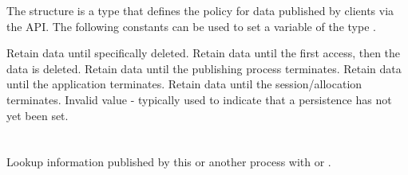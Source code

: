 The  structure is a  type that defines the policy for data published by clients via the  \ac{API}.
The following constants can be used to set a variable of the type .

\begin{constantdesc}
%
Retain data until specifically deleted.
%
Retain data until the first access, then the data is deleted.
%
Retain data until the publishing process terminates.
%
Retain data until the application terminates.
%
Retain data until the session/allocation terminates.
%
Invalid value - typically used to indicate that a persistence has not yet been set.
%
\end{constantdesc}


\section{}

\summary

Lookup information published by this or another process with  or .

\format


\begin{arglist}
\end{arglist}


